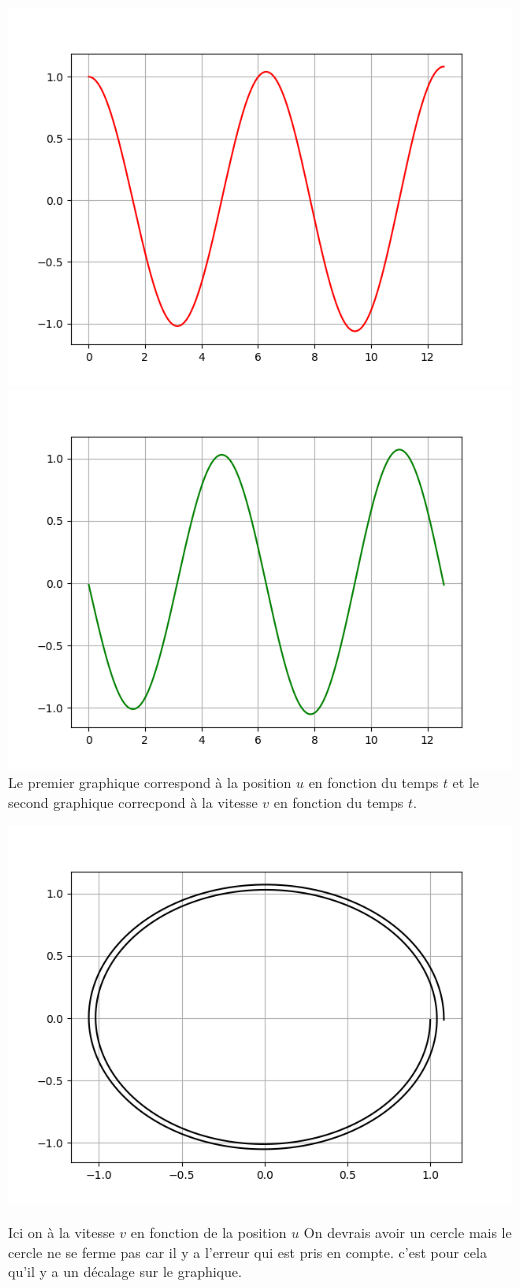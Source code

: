\documentclass{article}
\begin{document}
\includegraphics[scale=0.5]{position.png}
\includegraphics[scale=0.5]{vitesse.png}\\
Le premier graphique correspond à la position $u$ en fonction du temps $t$ et le second graphique correcpond à la vitesse $v$ en fonction du temps $t$.
\begin{center}
\includegraphics[scale=0.5]{vitpos.png} \\
\end{center}
Ici on à la vitesse $v$ en fonction de la position $u$
On devrais avoir un cercle mais le cercle ne se ferme pas car il y a l'erreur qui est pris en compte. c'est pour cela qu'il y a un décalage sur le graphique.
\end{document}
